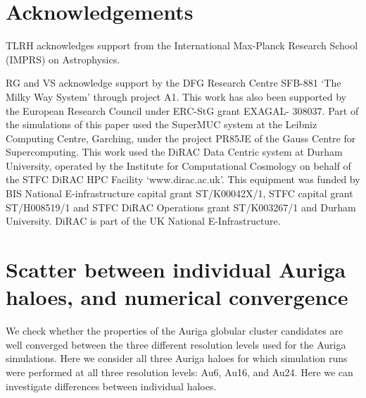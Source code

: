 \documentclass[a4paper,fleqn,usenatbib]{mnras}
\begin{document}
\section*{Acknowledgements}
TLRH acknowledges support from the International Max-Planck Research School (IMPRS) on Astrophysics.


RG and VS acknowledge support by the DFG Research Centre SFB-881 `The
Milky Way System' through project A1. This work has also been
supported by the European Research Council under ERC-StG grant
EXAGAL- 308037. Part of the simulations of this paper used the
SuperMUC system at the Leibniz Computing Centre, Garching,
under the project PR85JE of the Gauss Centre for Supercomputing.
This work used the DiRAC Data Centric system at Durham
University, operated by the Institute for Computational Cosmology
on behalf of the STFC DiRAC HPC Facility `www.dirac.ac.uk'.
This equipment was funded by BIS National E-infrastructure capital
grant ST/K00042X/1, STFC capital grant ST/H008519/1 and
STFC DiRAC Operations grant ST/K003267/1 and Durham University.
DiRAC is part of the UK National E-Infrastructure.









\clearpage
\appendix
\section{Scatter between individual Auriga haloes, and numerical convergence}
\label{sec:scatter-convergence}
We check whether the properties of the Auriga globular cluster candidates
are well converged between the three different resolution levels used for the
Auriga simulations. Here we consider all three Auriga haloes for which simulation
runs were performed at all three resolution levels: Au6, Au16, and Au24. Here
we can investigate differences between individual haloes.
\end{document}
